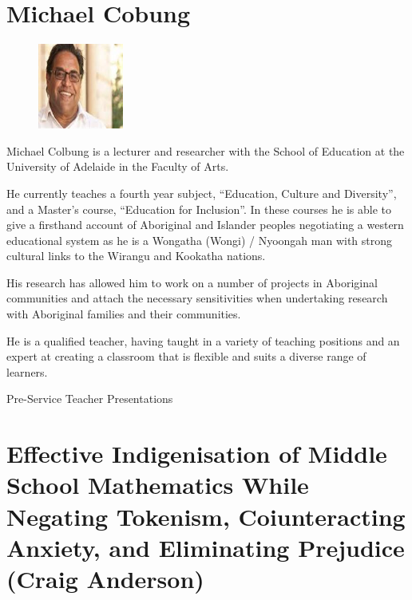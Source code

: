 \documentclass[twoside,14pt,a4paper,notitlepage]{memoir}
\begin{document}
\lipsum[1]

\section*{Michael Cobung}

\begin{figure}
\centering
\includegraphics[width=0.25\textwidth]{michael_colbung.jpeg}
\end{figure}

Michael Colbung is a lecturer and researcher with the School of Education at the University of Adelaide in the Faculty of Arts. 

He currently teaches a fourth year subject, “Education, Culture and Diversity”, and a Master’s course, “Education for Inclusion”. In these courses he is able to give a firsthand account of Aboriginal and Islander peoples negotiating a western educational system as he is a Wongatha (Wongi) / Nyoongah man with strong cultural links to the Wirangu and Kookatha nations.

His research has allowed him to work on a number of projects in Aboriginal communities and attach the necessary sensitivities when undertaking research with Aboriginal families and their communities.

He is a qualified teacher, having taught in a variety of teaching positions and an expert at creating a classroom that is flexible and suits a diverse range of learners.
\vfill



\pagebreak
\vspace*{2cm}
{\Huge Pre-Service Teacher Presentations}
\vspace{2cm}

\section*{Effective Indigenisation of Middle School Mathematics While Negating Tokenism, Coiunteracting Anxiety, and Eliminating Prejudice (Craig Anderson)}
\label{aut:anderson}
\end{document}
